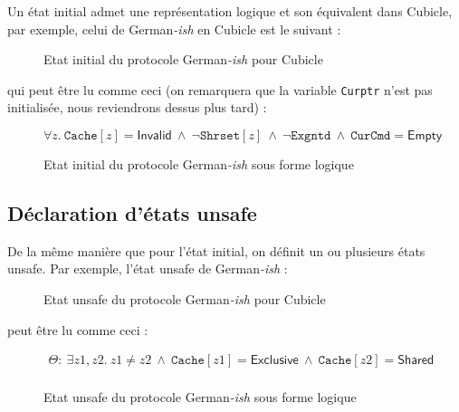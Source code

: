 \documentclass{memoir}
\begin{document}
		Un état initial admet une représentation logique et son équivalent dans Cubicle, par exemple, celui de German\textit{-ish} en Cubicle est le suivant :
		\begin{figure}[H]
			\centering	
			\begin{minipage}{0.65\linewidth}
				
			\end{minipage}
			\caption{Etat initial du protocole German\textit{-ish} pour Cubicle}
			\label{fig:gish_init_cub}
		\end{figure}
		
		qui peut être lu comme ceci (on remarquera que la variable \texttt{Curptr} n'est pas initialisée, nous reviendrons dessus plus tard) :
		
		\begin{figure}[H]
			\[\forall z.~ \mathtt{Cache}[z] = \mathsf{Invalid} ~\land~ \neg
			\mathtt{Shrset}[z] ~\land~ \neg \mathtt{Exgntd} ~\land~ \mathtt{CurCmd} =
			\mathsf{Empty}\]
			\caption{Etat initial du protocole German\textit{-ish} sous forme logique}
			\label{fig:gish_init_log}
			
		\end{figure}

		
					
		\subsection{Déclaration d'états unsafe}
		\label{subsec:decl_unsafe}

		De la même manière que pour l'état initial, on définit un ou plusieurs états unsafe. Par exemple, l'état unsafe de German\textit{-ish} :
		
		\begin{figure}[h]
			\centering	
			\begin{minipage}{0.65\linewidth}
				
			\end{minipage}
			\caption{Etat unsafe du protocole German\textit{-ish} pour Cubicle}
			\label{fig:gish_unsafe_cub}
		\end{figure}		
		
		peut être lu comme ceci :
		
		\begin{figure}[h]
			\[
				\begin{array}{l}
				\Theta : ~\exists z1,z2. ~z1\neq z2 ~\land~ \mathtt{Cache}[z1] = \mathsf{Exclusive}
				~\land~ \mathtt{Cache}[z2] = \mathsf{Shared}
				\\[0.5em]
				\end{array}
			\]
			\caption{Etat unsafe du protocole German\textit{-ish} sous forme logique}
			\label{fig:gish_unsafe_log}			
		\end{figure}
		
\end{document}
